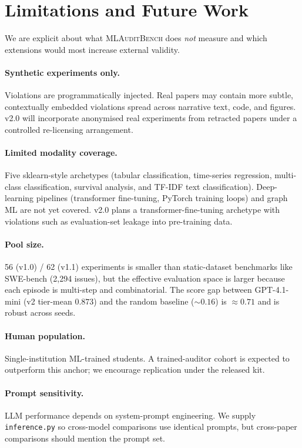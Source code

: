 \documentclass{article}
\begin{document}
\section{Limitations and Future Work}
\label{sec:limitations}

We are explicit about what \textsc{MLAuditBench} does \emph{not} measure
and which extensions would most increase external validity.

\paragraph{Synthetic experiments only.}
Violations are programmatically injected.  Real papers may contain more
subtle, contextually embedded violations spread across narrative text,
code, and figures.  v2.0 will incorporate anonymised real experiments
from retracted papers under a controlled re-licensing arrangement.

\paragraph{Limited modality coverage.}
Five sklearn-style archetypes (tabular classification, time-series
regression, multi-class classification, survival analysis, and
TF-IDF text classification).  Deep-learning pipelines (transformer
fine-tuning, PyTorch training loops) and graph ML are not yet
covered.  v2.0 plans a transformer-fine-tuning archetype with
violations such as evaluation-set leakage into pre-training data.

\paragraph{Pool size.}
56 (v1.0) / 62 (v1.1) experiments is smaller than static-dataset
benchmarks like SWE-bench (2{,}294 issues), but the effective
evaluation space is larger because each episode is multi-step and
combinatorial.
The score gap between GPT-4.1-mini (v2 tier-mean $0.873$) and the
random baseline (${\sim}0.16$) is ${\approx}0.71$ and is robust across
seeds.

\paragraph{Human population.}
Single-institution ML-trained students.  A trained-auditor cohort is
expected to outperform this anchor; we encourage replication under the
released kit.

\paragraph{Prompt sensitivity.}
LLM performance depends on system-prompt engineering.  We supply
\texttt{inference.py} so cross-model comparisons use identical prompts,
but cross-paper comparisons should mention the prompt set.
\end{document}
